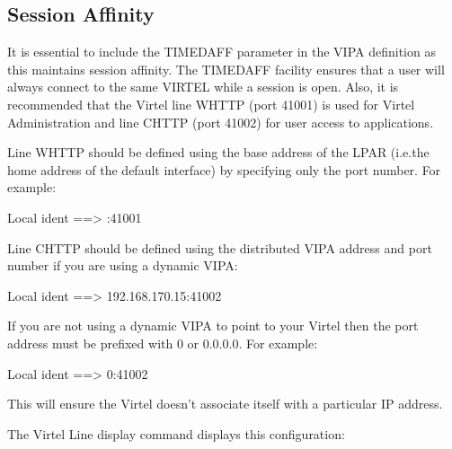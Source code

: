 \documentclass[letterpaper,10pt,english]{sphinxmanual}
\begin{document}
\subsection{Session Affinity}
\label{\detokenize{connectivity_guide:session-affinity}}\label{\detokenize{connectivity_guide:index-174}}
\sphinxAtStartPar
It is essential to include the TIMEDAFF parameter in the VIPA definition as this maintains session affinity. The TIMEDAFF facility ensures that a user will always connect to the same VIRTEL while a session is open. Also, it is recommended that the Virtel line W\sphinxhyphen{}HTTP (port 41001) is used for Virtel Administration and line C\sphinxhyphen{}HTTP (port 41002) for user access
to applications.

\sphinxAtStartPar
Line W\sphinxhyphen{}HTTP should be defined using the base address of the LPAR (i.e.the home address of the default interface) by specifying only the port number. For example:

\sphinxAtStartPar
Local ident ==\textgreater{} :41001

\sphinxAtStartPar
Line C\sphinxhyphen{}HTTP should be defined using the distributed VIPA address and port number if you are using a dynamic VIPA:

\sphinxAtStartPar
Local ident ==\textgreater{} 192.168.170.15:41002

\sphinxAtStartPar
If you are not using a dynamic VIPA to point to your Virtel then the port address must be prefixed with 0 or 0.0.0.0. For example:\sphinxhyphen{}

\sphinxAtStartPar
Local ident ==\textgreater{} 0:41002

\sphinxAtStartPar
This will ensure the Virtel doesn’t associate itself with a particular IP address.

\sphinxAtStartPar
The Virtel Line display command displays this configuration:
\end{document}
